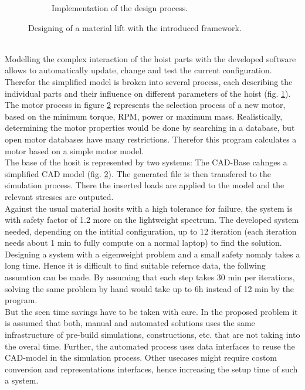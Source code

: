 \begin{figure}[h]
\begin{subfigure}[b]{0.95\textwidth}
        \caption{\label{pic:lift_solu} Implementation of the design process.}
    \end{subfigure}
    \caption{\label{pic:lift} Designing of a material lift with the introduced framework.}
\end{figure}\\
Modelling the complex interaction of the hoist parts with the developed software allows to automatically update, change and test the current configuration.
Therefor the simplified model is broken into several process, each describing the individual parts and their influence on different parameters of the hoist (fig. \ref{pic:lift_solu}).\\
The motor process in figure \ref{pic:lift} represents the selection process of a new motor, based on the minimum torque, RPM, power or maximum mass.
Realistically, determining the motor properties would be done by searching in a database, but open motor databases have many restrictions.
Therefor this program calculates a motor based on a simple motor model.\\
The base of the hosit is represented by two systems:
The CAD-Base cahnges a simplified CAD model (fig. \ref{pic:lift}).
The generated file is then  transfered to the simulation process.
There the inserted loads are applied to the model and the relevant stresses are outputed.\\
Against the usual material hosits with a high tolerance for failure,
the system is with safety factor of 1.2 more on the lightweight spectrum.
The developed system needed, depending on the intitial configuration, up to 12 iteration (each iteration needs about 1 min to fully compute on a normal laptop) to find the solution.
Designing a system with a eigenweight problem and a small safety nomaly takes a long time.
Hence it is difficult to find suitable refernce data, the follwing assumtion can be made.
By assuming that each step takes 30 min per iterations, solving the same problem by hand would take up to 6h instead of 12 min by the program.\\
But the seen time savings have to be taken with care.
In the proposed problem it is assumed that both, manual and automated solutions uses the same infrastructure of pre-build simulations, constructions, etc. that are not taking into the overal time.
Further, the automated process uses data interfaces to reuse the CAD-model in the simulation process.
Other usecases might require costom conversion and representations interfaces, hence increasing the setup time of such a system.\\
